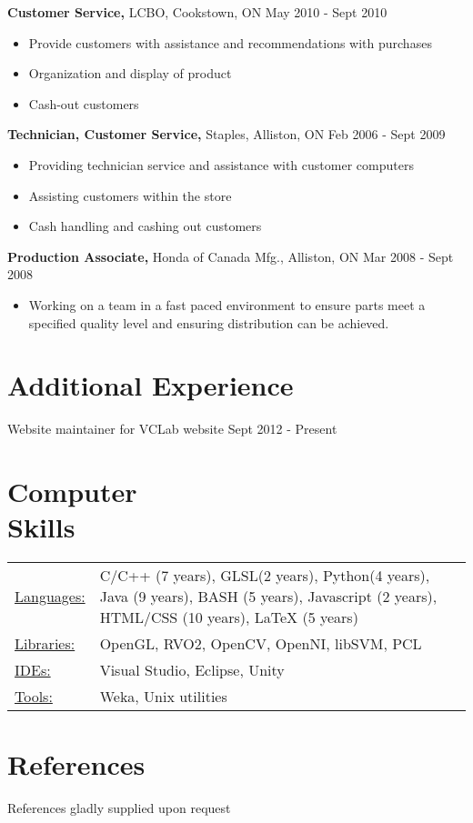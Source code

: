 \documentclass[margin]{res}
\begin{document}
\begin{resume}
	{\bf Customer Service,} LCBO, Cookstown, ON \hfill May 2010 - Sept 2010
	\begin{itemize} \itemsep -2pt
	\item Provide customers with assistance and recommendations with purchases
	\item Organization and display of product
	\item Cash-out customers
	\end{itemize}

	{\bf Technician, Customer Service,} Staples, Alliston, ON \hfill Feb 2006 - Sept 2009
	\begin{itemize} \itemsep -2pt
	\item Providing technician service and assistance with customer computers
	\item Assisting customers within the store
	\item Cash handling and cashing out customers
	\end{itemize}

	{\bf Production Associate,} Honda of Canada Mfg., Alliston, ON \hfill Mar 2008 - Sept 2008
	\begin{itemize} \itemsep -2pt
	\item Working on a team in a fast paced environment to ensure parts meet a specified quality level and ensuring distribution can be achieved.
	\end{itemize}

\section{Additional Experience}
	Website maintainer for VCLab website \hfill Sept 2012 - Present\\
 

\section{Computer \\ Skills}
   \begin{tabular}{l p{3in}}
    \underline{Languages:} & C/C++ (7 years), GLSL(2 years), Python(4 years), Java (9 years), BASH (5 years),  Javascript (2 years), HTML/CSS (10 years), LaTeX (5 years)\\
    \underline{Libraries:} & OpenGL, RVO2, OpenCV, OpenNI, libSVM, PCL\\
    \underline{IDEs:} & Visual Studio, Eclipse, Unity\\
    \underline{Tools:} & Weka, Unix utilities \\
 \end{tabular}

\section{References}
	References gladly supplied upon request

\end{resume} 
\end{document}
